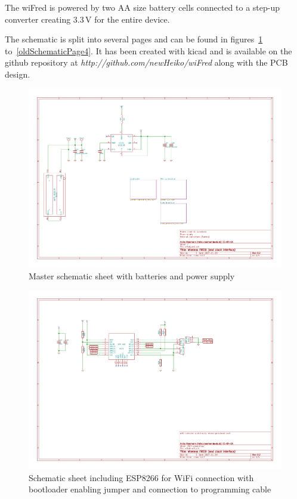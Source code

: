 \documentclass[11pt,a4paper]{scrartcl}
\begin{document}
The wiFred is powered by two AA size battery cells connected to a step-up converter creating 3.3\,V for the entire device.

The schematic is split into several pages and can be found in figures~\ref{oldSchematicPage1} to~\ref{oldSchematicPage4}. It has been created with kicad and is available on the github repository at \textit{http://github.com/newHeiko/wiFred} along with the PCB design.

\begin{figure}[tbh]
  \centering
  \includegraphics[width=\textwidth]{images/old_wfred_rev2}
  \caption{Master schematic sheet with batteries and power supply}
  \label{oldSchematicPage1}
\end{figure}

\begin{figure}[tbh]
  \centering
  \includegraphics[width=\textwidth]{images/old_wfred-wifi-Wifi_connection}
  \caption{Schematic sheet including ESP8266 for WiFi connection with bootloader enabling jumper and connection to programming cable}
  \label{oldSchematicPage2}
\end{figure}
\end{document}

